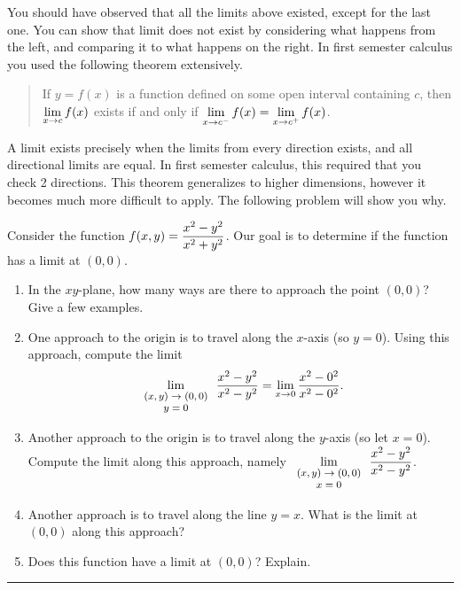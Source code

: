 You should have observed that all the limits above existed, except for the last one.  You can show that limit does not exist by considering what happens from the left, and comparing it to what happens on the right.  In first semester calculus you used the following theorem extensively. 
\begin{quote}
 If $y=f(x)$ is a function defined on some open interval containing $c$, then $\displaystyle\lim_{x\to c}f(x)$ exists if and only if  $\displaystyle\lim_{x\to c^-}f(x) = \displaystyle\lim_{x\to c^+}f(x)$.
\end{quote}
 A limit exists precisely when the limits from every direction exists, and all directional limits are equal. In first semester calculus, this required that you check 2 directions. This theorem generalizes to higher dimensions, however it becomes much more difficult to apply. The following problem will show you why.
\begin{problem}
 Consider the function $\displaystyle f(x,y)=\frac{x^2-y^2}{x^2+y^2}$.
Our goal is to determine if the function has a limit at $(0,0)$.
\begin{enumerate}
 \item In the $xy$-plane, how many ways are there to approach the point $(0,0)$? Give a few examples.
 \item One approach to the origin is to travel along the $x$-axis (so $y=0$). Using this approach, compute the limit 
$$\displaystyle\lim_{\text{\footnotesize $\begin{array}{c}(x,y)\to(0,0)\\ y=0\end{array}$}}\frac{x^2-y^2}{x^2-y^2} = \lim_{x\to 0} \frac{x^2-0^2}{x^2-0^2}.$$
 \item Another approach to the origin is to travel along the $y$-axis (so let $x=0$). Compute the limit along this approach, namely 
$\displaystyle\lim_{\text{\footnotesize $\begin{array}{c}(x,y)\to(0,0)\\ x=0\end{array}$}}\frac{x^2-y^2}{x^2-y^2}$.
 \item Another approach is to travel along the line $y=x$.  What is the limit at $(0,0)$ along this approach?
 \item Does this function have a limit at $(0,0)$? Explain. %
\end{enumerate}
\hrule\end{problem}

